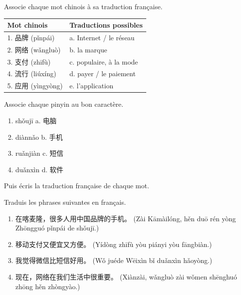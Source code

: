 \documentclass[11pt]{article}
\newcounter{popsec}
\newcounter{popsub}
\newcommand{\courssub}[1]{%
  \stepcounter{popsub}%
  \par\vspace{9pt}\noindent{\popxbold\fontsize{11.5}{13}\selectfont\color{popink}{\color{poporange}\thepopsec.\thepopsub}\hspace{6pt}#1}\par\nopagebreak\vspace{4pt}
}
\begin{document}
\begin{exercice}
Associe chaque mot chinois à sa traduction française.
\begin{center}
\begin{tabularx}{\linewidth}{|X|X|}
\hline
\rowcolor{popblueL} Mot chinois & Traductions possibles \\
\hline
1. 品牌 (pǐnpái) & a. Internet / le réseau \\
\hline
2. 网络 (wǎngluò) & b. la marque \\
\hline
3. 支付 (zhīfù) & c. populaire, à la mode \\
\hline
4. 流行 (liúxíng) & d. payer / le paiement \\
\hline
5. 应用 (yìngyòng) & e. l'application \\
\hline
\end{tabularx}
\end{center}
\end{exercice}

\begin{exercice}
Associe chaque pinyin au bon caractère.
\begin{enumerate}
\item shǒujī \hspace{1cm} a. 电脑
\item diànnǎo \hspace{1cm} b. 手机
\item ruǎnjiàn \hspace{1cm} c. 短信
\item duǎnxìn \hspace{1cm} d. 软件
\end{enumerate}
Puis écris la traduction française de chaque mot.
\end{exercice}

\courssub{Je m'entraîne}

\begin{exercice}
Traduis les phrases suivantes en français.
\begin{enumerate}
\item 在喀麦隆，很多人用中国品牌的手机。 (Zài Kāmàilóng, hěn duō rén yòng Zhōngguó pǐnpái de shǒujī.)
\item 移动支付又便宜又方便。 (Yídòng zhīfù yòu piányi yòu fāngbiàn.)
\item 我觉得微信比短信好用。 (Wǒ juéde Wēixìn bǐ duǎnxìn hǎoyòng.)
\item 现在，网络在我们生活中很重要。 (Xiànzài, wǎngluò zài wǒmen shēnghuó zhōng hěn zhòngyào.)
\end{enumerate}
\end{exercice}
\end{document}
